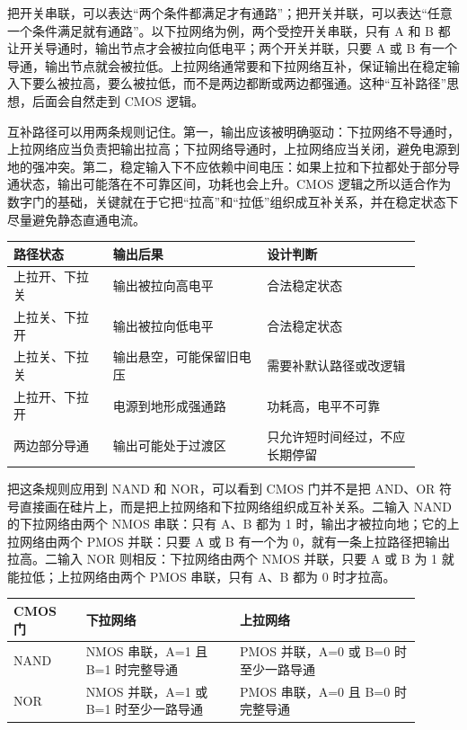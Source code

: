 把开关串联，可以表达“两个条件都满足才有通路”；把开关并联，可以表达“任意一个条件满足就有通路”。以下拉网络为例，两个受控开关串联，只有 A 和 B 都让开关导通时，输出节点才会被拉向低电平；两个开关并联，只要 A 或 B 有一个导通，输出节点就会被拉低。上拉网络通常要和下拉网络互补，保证输出在稳定输入下要么被拉高，要么被拉低，而不是两边都断或两边都强通。这种“互补路径”思想，后面会自然走到 CMOS 逻辑。

互补路径可以用两条规则记住。第一，输出应该被明确驱动：下拉网络不导通时，上拉网络应当负责把输出拉高；下拉网络导通时，上拉网络应当关闭，避免电源到地的强冲突。第二，稳定输入下不应依赖中间电压：如果上拉和下拉都处于部分导通状态，输出可能落在不可靠区间，功耗也会上升。CMOS 逻辑之所以适合作为数字门的基础，关键就在于它把“拉高”和“拉低”组织成互补关系，并在稳定状态下尽量避免静态直通电流。

\begin{longtable}{L{0.22\linewidth}L{0.34\linewidth}L{0.34\linewidth}}
\toprule
路径状态 & 输出后果 & 设计判断 \\
\midrule
上拉开、下拉关 & 输出被拉向高电平 & 合法稳定状态 \\
上拉关、下拉开 & 输出被拉向低电平 & 合法稳定状态 \\
上拉关、下拉关 & 输出悬空，可能保留旧电压 & 需要补默认路径或改逻辑 \\
上拉开、下拉开 & 电源到地形成强通路 & 功耗高，电平不可靠 \\
两边部分导通 & 输出可能处于过渡区 & 只允许短时间经过，不应长期停留 \\
\bottomrule
\end{longtable}

把这条规则应用到 NAND 和 NOR，可以看到 CMOS 门并不是把 AND、OR 符号直接画在硅片上，而是把上拉网络和下拉网络组织成互补关系。二输入 NAND 的下拉网络由两个 NMOS 串联：只有 A、B 都为 1 时，输出才被拉向地；它的上拉网络由两个 PMOS 并联：只要 A 或 B 有一个为 0，就有一条上拉路径把输出拉高。二输入 NOR 则相反：下拉网络由两个 NMOS 并联，只要 A 或 B 为 1 就能拉低；上拉网络由两个 PMOS 串联，只有 A、B 都为 0 时才拉高。

\begin{longtable}{L{0.16\linewidth}L{0.34\linewidth}L{0.4\linewidth}}
\toprule
CMOS 门 & 下拉网络 & 上拉网络 \\
\midrule
NAND & NMOS 串联，A=1 且 B=1 时完整导通 & PMOS 并联，A=0 或 B=0 时至少一路导通 \\
NOR & NMOS 并联，A=1 或 B=1 时至少一路导通 & PMOS 串联，A=0 且 B=0 时完整导通 \\
\bottomrule
\end{longtable}

